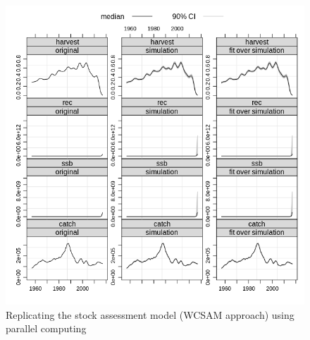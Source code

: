 \documentclass[a4paper,english,10pt]{article}\usepackage[]{graphicx}\usepackage[]{color}
\newenvironment{knitrout}{}{} %
\begin{document}
\begin{knitrout}
\color{fgcolor}\begin{figure}[H]

{\centering \includegraphics[width=.9\linewidth]{figure/wcsampar-1} 

}

\caption[Replicating the stock assessment model (WCSAM approach) using parallel computing]{Replicating the stock assessment model (WCSAM approach) using parallel computing}\label{fig:wcsampar}
\end{figure}


\end{knitrout}



\end{document}
